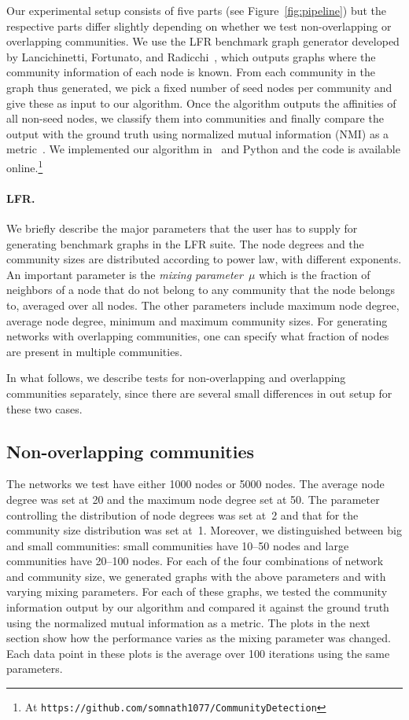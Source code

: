 Our experimental setup consists of five parts (see Figure~\ref{fig:pipeline}) but the 
respective parts differ slightly depending on whether we test non-overlapping or overlapping 
communities. We use the LFR benchmark graph generator developed by Lancichinetti, 
Fortunato, and Radicchi~\cite{LFR08,LF09}, which outputs graphs where the community 
information of each node is known. From each community in the graph thus generated, 
we pick a fixed number of seed nodes per community and give these as input to our algorithm. 
Once the algorithm outputs the affinities of all non-seed nodes, we classify them into 
communities and finally compare the output with the ground truth using 
normalized mutual information (NMI) as a metric~\cite{DDDA05}. We implemented 
our algorithm in \CPP\ and Python and the code is available online.\footnote{At 
\texttt{https://github.com/somnath1077/CommunityDetection}}


\paragraph{LFR.}
We briefly describe the major parameters that the user has to supply 
for generating benchmark graphs in the LFR suite. The node degrees and the 
community sizes are distributed according to power law, with different exponents. 
An important parameter is the \emph{mixing parameter~$\mu$} which is the fraction of neighbors 
of a node that do not belong to any community that the node belongs to, averaged over all nodes.
The other parameters include maximum node degree, average node degree, 
minimum and maximum community sizes. For generating networks with overlapping communities, 
one can specify what fraction of nodes are present in multiple communities.


In what follows, we describe tests for non-overlapping and overlapping communities separately, since 
there are several small differences in out setup for these two cases. 

\subsection{Non-overlapping communities}
The networks we test have either 1000 nodes or 5000 nodes. The average node degree
was set at 20 and the maximum node degree set at 50. The parameter controlling the 
distribution of node degrees was set at~2 and that for the community size distribution was 
set at~1. Moreover, we distinguished between big and small communities: small communities have 
10--50 nodes and large communities have 20--100 nodes. 
For each of the four combinations of network and community size, we generated graphs with the 
above parameters and with varying mixing parameters. For each of these graphs, we tested the 
community information output by our algorithm and compared it against the ground truth 
using the normalized mutual information as a metric. The plots in the next section 
show how the performance varies as the mixing parameter was changed. Each data point in 
these plots is the average over 100 iterations using the same parameters. 

